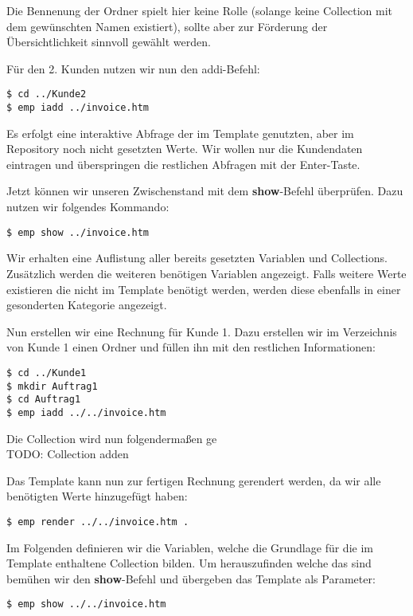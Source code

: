 Die Bennenung der Ordner spielt hier keine Rolle (solange keine Collection mit dem gewünschten Namen existiert), sollte aber zur Förderung der Übersichtlichkeit sinnvoll gewählt werden.

Für den 2. Kunden nutzen wir nun den addi-Befehl:
\begin{lstlisting}[style=Bash]
$ cd ../Kunde2
$ emp iadd ../invoice.htm
\end{lstlisting}

Es erfolgt eine interaktive Abfrage der im Template genutzten, aber im Repository noch nicht gesetzten Werte. Wir wollen nur die Kundendaten eintragen und überspringen die restlichen Abfragen mit der Enter-Taste.

Jetzt können wir unseren Zwischenstand mit dem \textbf{show}-Befehl überprüfen. Dazu nutzen wir folgendes Kommando:
\begin{lstlisting}[style=Bash]
$ emp show ../invoice.htm
\end{lstlisting}

Wir erhalten eine Auflistung aller bereits gesetzten Variablen und Collections. Zusätzlich werden die weiteren benötigen Variablen angezeigt. Falls weitere Werte existieren die nicht im Template benötigt werden, werden diese ebenfalls in einer gesonderten Kategorie angezeigt.

Nun erstellen wir eine Rechnung für Kunde 1. Dazu erstellen wir im Verzeichnis von Kunde 1 einen Ordner und füllen ihn mit den restlichen Informationen:

\begin{lstlisting}[style=Bash]
$ cd ../Kunde1
$ mkdir Auftrag1
$ cd Auftrag1
$ emp iadd ../../invoice.htm
\end{lstlisting}

Die Collection wird nun folgendermaßen ge\\
TODO: Collection adden

Das Template kann nun zur fertigen Rechnung gerendert werden, da wir alle benötigten Werte hinzugefügt haben:
\begin{lstlisting}[style=Bash]
$ emp render ../../invoice.htm .
\end{lstlisting}

Im Folgenden definieren wir die Variablen, welche die Grundlage für die im Template enthaltene Collection bilden. Um herauszufinden welche das sind bemühen wir den \textbf{show}-Befehl und übergeben das Template als Parameter:
\begin{lstlisting}[style=Bash]
$ emp show ../../invoice.htm
\end{lstlisting}

